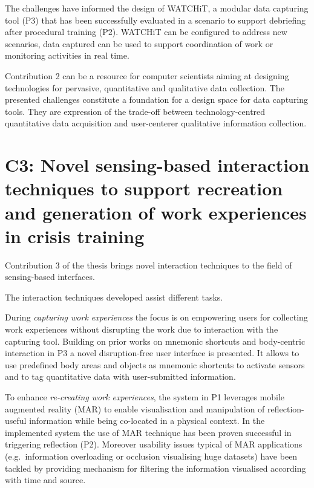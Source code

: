 The challenges have informed the design of WATCHiT, a modular data
capturing tool (P3) that has been successfully evaluated in a scenario
to support debriefing after procedural training (P2). WATCHiT can be
configured to address new scenarios, data captured can be used to
support coordination of work or monitoring activities in real time.

Contribution 2 can be a resource for computer scientists aiming at
designing technologies for pervasive, quantitative and qualitative data
collection. The presented challenges constitute a foundation for a
design space for data capturing tools. They are expression of the
trade-off between technology-centred quantitative data acquisition and
user-centerer qualitative information collection.

\section{C3: Novel sensing-based interaction techniques to support
recreation and generation of work experiences in crisis
training}\label{c3-novel-sensing-based-interaction-techniques-to-support-recreation-and-generation-of-work-experiences-in-crisis-training}

Contribution 3 of the thesis brings novel interaction techniques to the
field of sensing-based interfaces.

The interaction techniques developed assist different tasks.

During \emph{capturing work experiences} the focus is on empowering
users for collecting work experiences without disrupting the work due to
interaction with the capturing tool. Building on prior works on mnemonic
shortcuts and body-centric interaction in P3 a novel disruption-free
user interface is presented. It allows to use predefined body areas and
objects as mnemonic shortcuts to activate sensors and to tag
quantitative data with user-submitted information.

To enhance \emph{re-creating work experiences}, the system in P1
leverages mobile augmented reality (MAR) to enable visualisation and
manipulation of reflection-useful information while being co-located in
a physical context. In the implemented system the use of MAR technique
has been proven successful in triggering reflection (P2). Moreover
usability issues typical of MAR applications (e.g.~information
overloading or occlusion visualising huge datasets) have been tackled by
providing mechanism for filtering the information visualised according
with time and source.

